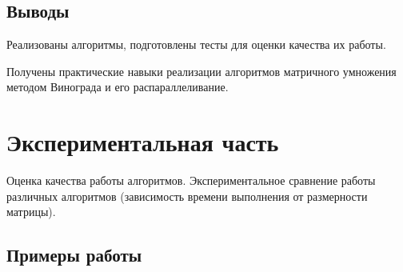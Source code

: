 \documentclass[a4paper,14pt]{article} %
\begin{document}
	\subsection{Выводы}
	\hfill
	
	Реализованы алгоритмы, подготовлены тесты для оценки качества их работы. 
        
        Получены практические навыки реализации алгоритмов матричного умножения методом Винограда и его распараллеливание. 
	
        \hfill
        
        
        \newpage

        \section{Экспериментальная часть}
       
        Оценка качества работы алгоритмов. Экспериментальное сравнение работы различных алгоритмов (зависимость времени выполнения от размерности матрицы). 
        \subsection{Примеры работы}
	\hfill
	
\end{document}
